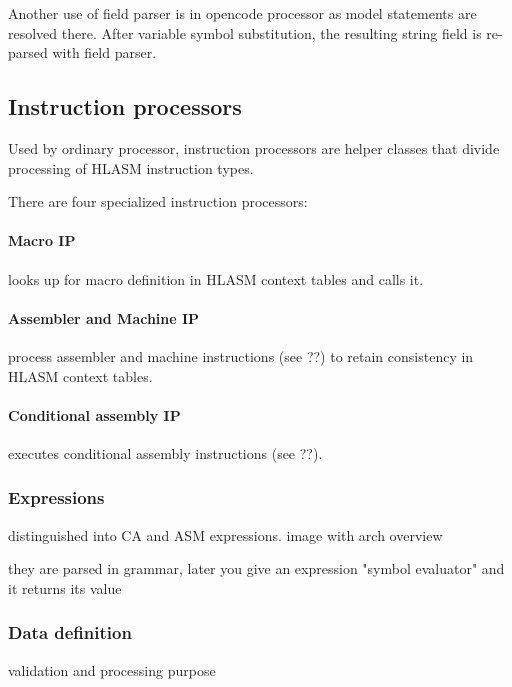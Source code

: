 Another use of field parser is in opencode processor as model statements are resolved there. After variable symbol substitution, the resulting string field is re-parsed with field parser.

\subsection{Instruction processors}

Used by ordinary processor, instruction processors are helper classes that divide processing of HLASM instruction types.

There are four specialized instruction processors:
\paragraph*{Macro IP} looks up for macro definition in HLASM context tables and calls it.
\paragraph*{Assembler and Machine IP} process assembler and machine instructions (see ??) to retain consistency in HLASM context tables.

\paragraph*{Conditional assembly IP} executes conditional assembly instructions (see ??). 

\subsubsection{Expressions}

distinguished into CA and ASM expressions. 
image with arch
overview

they are parsed in grammar, later you give an expression "symbol evaluator" and it returns its value


\subsubsection{Data definition}

validation and processing purpose